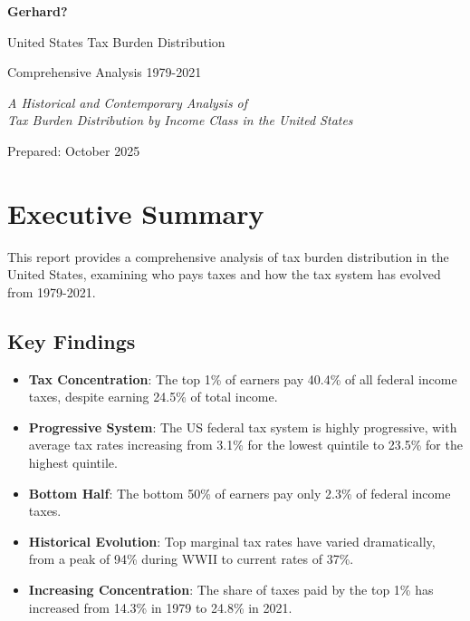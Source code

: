 \documentclass[11pt,letterpaper]{article}
\begin{document}
\begin{titlepage}
\centering
\vspace*{2cm}
{\Huge\bfseries Gerhard?\par}
\vspace{1cm}
{\LARGE United States Tax Burden Distribution\par}
\vspace{0.5cm}
{\Large Comprehensive Analysis 1979-2021\par}
\vspace{2cm}
{\large\itshape A Historical and Contemporary Analysis of\\
Tax Burden Distribution by Income Class in the United States\par}
\vfill
{\large Prepared: October 2025\par}
\end{titlepage}

\tableofcontents
\newpage

\section{Executive Summary}

This report provides a comprehensive analysis of tax burden distribution in the United States, examining who pays taxes and how the tax system has evolved from 1979-2021.

\subsection{Key Findings}

\begin{itemize}
    \item \textbf{Tax Concentration}: The top 1\% of earners pay 40.4\% of all federal income taxes, despite earning 24.5\% of total income.
    \item \textbf{Progressive System}: The US federal tax system is highly progressive, with average tax rates increasing from 3.1\% for the lowest quintile to 23.5\% for the highest quintile.
    \item \textbf{Bottom Half}: The bottom 50\% of earners pay only 2.3\% of federal income taxes.
    \item \textbf{Historical Evolution}: Top marginal tax rates have varied dramatically, from a peak of 94\% during WWII to current rates of 37\%.
    \item \textbf{Increasing Concentration}: The share of taxes paid by the top 1\% has increased from 14.3\% in 1979 to 24.8\% in 2021.
\end{itemize}
\end{document}
